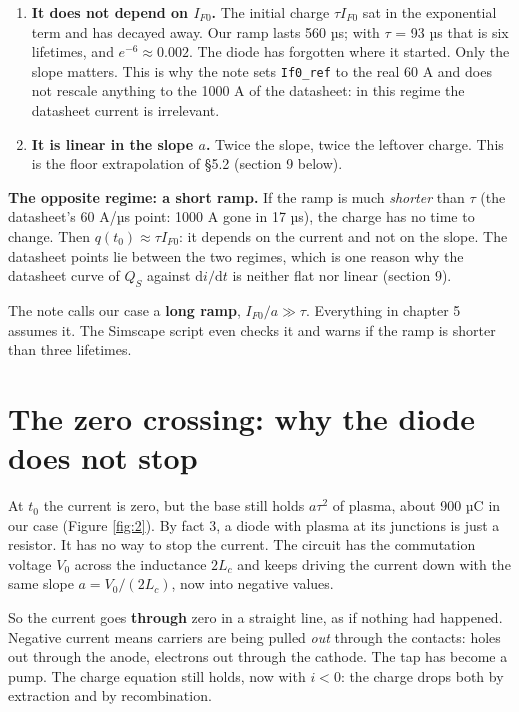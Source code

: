 \documentclass[11pt,a4paper,numbers=noenddot]{scrartcl}
\begin{document}
\begin{onehalfspace}
\begin{enumerate}
\def\labelenumi{\arabic{enumi}.}
\item
  \textbf{It does not depend on \(I_{F0}\).} The initial charge \(\tau I_{F0}\) sat in the exponential term and has decayed away. Our ramp lasts 560 µs; with \(\tau\) = 93 µs that is six lifetimes, and \(e^{-6} \approx 0.002\). The diode has forgotten where it started. Only the slope matters. This is why the note sets \texttt{If0\_ref} to the real 60 A and does not rescale anything to the 1000 A of the datasheet: in this regime the datasheet current is irrelevant.
\item
  \textbf{It is linear in the slope \(a\).} Twice the slope, twice the leftover charge. This is the floor extrapolation of \S5.2 (section 9 below).
\end{enumerate}

\textbf{The opposite regime: a short ramp.} If the ramp is much \emph{shorter} than \(\tau\) (the datasheet's 60 A/µs point: 1000 A gone in 17 µs), the charge has no time to change. Then \(q(t_0) \approx \tau I_{F0}\): it depends on the current and not on the slope. The datasheet points lie between the two regimes, which is one reason why the datasheet curve of \(Q_S\) against \(\mathrm{d}i/\mathrm{d}t\) is neither flat nor linear (section 9).

The note calls our case a \textbf{long ramp}, \(I_{F0}/a \gg \tau\). Everything in chapter 5 assumes it. The Simscape script even checks it and warns if the ramp is shorter than three lifetimes.

\section{The zero crossing: why the diode does not stop}\label{the-zero-crossing-why-the-diode-does-not-stop}

At \(t_0\) the current is zero, but the base still holds \(a\tau^2\) of plasma, about 900 µC in our case (Figure \ref{fig:2}). By fact 3, a diode with plasma at its junctions is just a resistor. It has no way to stop the current. The circuit has the commutation voltage \(V_0\) across the inductance \(2L_c\) and keeps driving the current down with the same slope \(a = V_0/(2L_c)\), now into negative values.

So the current goes \textbf{through} zero in a straight line, as if nothing had happened. Negative current means carriers are being pulled \emph{out} through the contacts: holes out through the anode, electrons out through the cathode. The tap has become a pump. The charge equation still holds, now with \(i < 0\): the charge drops both by extraction and by recombination.


\end{onehalfspace}
\end{document}
